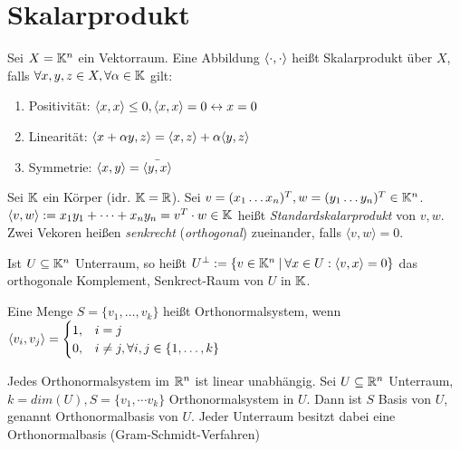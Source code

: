 \pagebreak

\section{Skalarprodukt}

\begin{definition}[Skalarprodukt]
	Sei $X = \mathbb{K}^n$ ein Vektorraum. Eine Abbildung $\langle \cdot, \cdot \rangle$ heißt Skalarprodukt über $X$, falls $\forall x,y,z \in X, \forall \alpha \in \mathbb{K}$ gilt:
	
	\begin{enumerate}[noitemsep]
		\item Positivität: $\langle x, x \rangle \leq 0, \langle x, x \rangle = 0 \leftrightarrow x = 0$
		\item Linearität: $\langle x + \alpha y, z \rangle = \langle x, z \rangle + \alpha \langle y, z \rangle$
		\item  Symmetrie: $\langle x, y \rangle = \bar{\langle y, x \rangle}$
	\end{enumerate}
\end{definition}


\begin{definition}[Standardskalarprodukt]
	Sei $\mathbb{K}$ ein Körper (idr. $\mathbb{K} = \mathbb{R}$). Sei $v = (x_1 \dots x_n)^T, w = (y_1 \dots y_n)^T \in \mathbb{K}^n$. $\langle v, w \rangle := x_1y_1 + \dots + x_ny_n = v^T \cdot w \in \mathbb{K}$ heißt \emph{Standardskalarprodukt} von $v,w$.	Zwei Vekoren heißen \emph{senkrecht} (\emph{orthogonal}) zueinander, falls $\langle v, w \rangle = 0$. 
	
	Ist $U \subseteq \mathbb{K}^n$ Unterraum, so heißt $U^{\perp} := \{ v \in \mathbb{K}^n \medspace | \medspace \forall x \in U : \langle v, x \rangle = 0 \}$ das orthogonale Komplement, Senkrect-Raum von $U$ in $\mathbb{K}$.
\end{definition}


\begin{definition}[Orthonormalsystem]
	Eine Menge $S = \{ v_1, \dots, v_k \} $ heißt Orthonormalsystem, wenn $\langle v_i, v_j \rangle = \begin{cases}
		1, & i = j \\
		0, & i \neq j, \forall i,j \in \{1, \dots, k\}
	\end{cases}$
\end{definition}

\begin{satz}
	Jedes Orthonormalsystem im $\mathbb{R}^n$ ist linear unabhängig. 
	Sei $U \subseteq \mathbb{R}^n$ Unterraum, $k = dim(U), S = \{v_1,\dotsm v_k\}$ Orthonormalsystem in $U$. Dann ist $S$ Basis von $U$, genannt Orthonormalbasis von $U$. Jeder Unterraum besitzt dabei eine Orthonormalbasis (Gram-Schmidt-Verfahren)
\end{satz}

